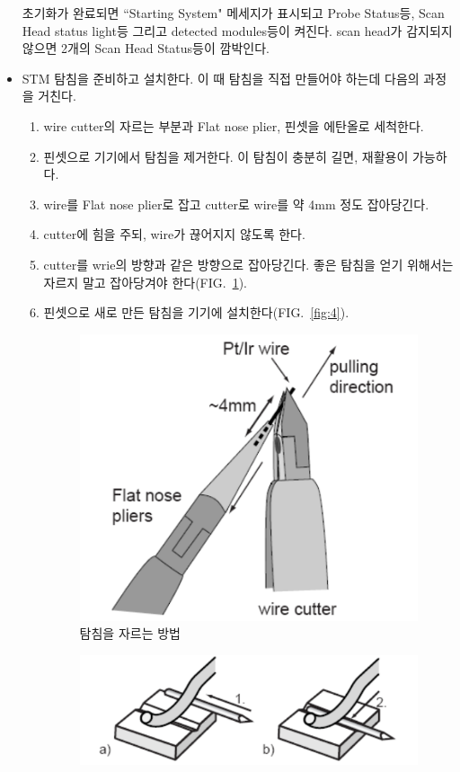 \documentclass[aps,reprint,superscriptaddress,11pt]{revtex4-2}
\begin{document}
\begin{itemize}
  초기화가 완료되면 “Starting System"
  메세지가 표시되고 Probe Status등, Scan Head status light등 그리고 detected modules등이 
  켜진다. scan head가 감지되지 않으면 2개의 Scan Head Status등이 깜박인다.
  \item[2. ] STM 탐침을 준비하고 설치한다. 이 때 탐침을 직접 만들어야 하는데 다음의 과정을
  거친다.
  \begin{small}
  \begin{enumerate}
    \item[(1)] wire cutter의 자르는 부분과 Flat nose plier, 핀셋을 에탄올로
    세척한다. 
    \item[(2)] 핀셋으로 기기에서 탐침을 제거한다. 이 탐침이 충분히 길면, 재활용이 가능하다.
    \item[(3)] wire를 Flat nose plier로 잡고 cutter로 wire를 약 4mm 정도 잡아당긴다.
    \item[(4)] cutter에 힘을 주되, wire가 끊어지지 않도록 한다.
    \item[(5)] cutter를 wrie의 방향과 같은 방향으로 잡아당긴다. 좋은 탐침을 얻기 위해서는
    자르지 말고 잡아당겨야 한다(FIG.~\ref{fig:3}).
    \item[(6)] 핀셋으로 새로 만든 탐침을 기기에 설치한다(FIG.~\ref{fig:4}).
      \begin{figure}[htp]
        \centering
        \includegraphics[scale=0.3]{tip.png}
        \caption{탐침을 자르는 방법}
        \label{fig:3}
      \end{figure}
      \begin{figure}[htp]
        \centering
        \includegraphics[scale=0.35]{tip2.png}

\end{figure}
\end{enumerate}
\end{small}
\end{itemize}
\end{document}
